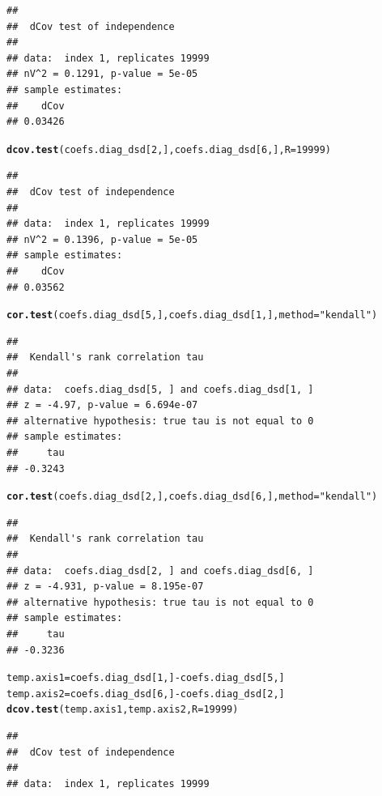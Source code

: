 \documentclass{article}\usepackage[]{graphicx}\usepackage[]{color}
\makeatletter
\newcommand{\hlnum}[1]{\textcolor[rgb]{0.686,0.059,0.569}{#1}}%
\newcommand{\hlstr}[1]{\textcolor[rgb]{0.192,0.494,0.8}{#1}}%
\newcommand{\hlopt}[1]{\textcolor[rgb]{0,0,0}{#1}}%
\newcommand{\hlstd}[1]{\textcolor[rgb]{0.345,0.345,0.345}{#1}}%
\newcommand{\hlkwb}[1]{\textcolor[rgb]{0.69,0.353,0.396}{#1}}%
\newcommand{\hlkwc}[1]{\textcolor[rgb]{0.333,0.667,0.333}{#1}}%
\newcommand{\hlkwd}[1]{\textcolor[rgb]{0.737,0.353,0.396}{\textbf{#1}}}%
\newenvironment{kframe}{%
 \def\at@end@of@kframe{}%
 \ifinner\ifhmode%
  \def\at@end@of@kframe{\end{minipage}}%
  \begin{minipage}{\columnwidth}%
 \fi\fi%
 \def\FrameCommand##1{\hskip\@totalleftmargin \hskip-\fboxsep
 \colorbox{shadecolor}{##1}\hskip-\fboxsep
     \hskip-\linewidth \hskip-\@totalleftmargin \hskip\columnwidth}%
 \MakeFramed {\advance\hsize-\width
   \@totalleftmargin\z@ \linewidth\hsize
   \@setminipage}}%
 {\par\unskip\endMakeFramed%
 \at@end@of@kframe}
\newenvironment{knitrout}{}{} %
\makeatother
\begin{document}
\begin{knitrout}
\begin{kframe}
\begin{alltt}
\end{alltt}
\begin{verbatim}
## 
## 	dCov test of independence
## 
## data:  index 1, replicates 19999
## nV^2 = 0.1291, p-value = 5e-05
## sample estimates:
##    dCov 
## 0.03426
\end{verbatim}
\begin{alltt}
\hlkwd{dcov.test}\hlstd{(coefs.diag_dsd[}\hlnum{2}\hlstd{,], coefs.diag_dsd[}\hlnum{6}\hlstd{,],} \hlkwc{R} \hlstd{=} \hlnum{19999}\hlstd{)}
\end{alltt}
\begin{verbatim}
## 
## 	dCov test of independence
## 
## data:  index 1, replicates 19999
## nV^2 = 0.1396, p-value = 5e-05
## sample estimates:
##    dCov 
## 0.03562
\end{verbatim}
\begin{alltt}
\hlkwd{cor.test}\hlstd{(coefs.diag_dsd[}\hlnum{5}\hlstd{,], coefs.diag_dsd[}\hlnum{1}\hlstd{,],} \hlkwc{method} \hlstd{=} \hlstr{"kendall"}\hlstd{)}
\end{alltt}
\begin{verbatim}
## 
## 	Kendall's rank correlation tau
## 
## data:  coefs.diag_dsd[5, ] and coefs.diag_dsd[1, ]
## z = -4.97, p-value = 6.694e-07
## alternative hypothesis: true tau is not equal to 0
## sample estimates:
##     tau 
## -0.3243
\end{verbatim}
\begin{alltt}
\hlkwd{cor.test}\hlstd{(coefs.diag_dsd[}\hlnum{2}\hlstd{,], coefs.diag_dsd[}\hlnum{6}\hlstd{,],} \hlkwc{method} \hlstd{=} \hlstr{"kendall"}\hlstd{)}
\end{alltt}
\begin{verbatim}
## 
## 	Kendall's rank correlation tau
## 
## data:  coefs.diag_dsd[2, ] and coefs.diag_dsd[6, ]
## z = -4.931, p-value = 8.195e-07
## alternative hypothesis: true tau is not equal to 0
## sample estimates:
##     tau 
## -0.3236
\end{verbatim}
\begin{alltt}
\hlstd{temp.axis1} \hlkwb{=} \hlstd{coefs.diag_dsd[}\hlnum{1}\hlstd{,]} \hlopt{-} \hlstd{coefs.diag_dsd[}\hlnum{5}\hlstd{,]}
\hlstd{temp.axis2} \hlkwb{=} \hlstd{coefs.diag_dsd[}\hlnum{6}\hlstd{,]} \hlopt{-} \hlstd{coefs.diag_dsd[}\hlnum{2}\hlstd{,]}
\hlkwd{dcov.test}\hlstd{(temp.axis1, temp.axis2,} \hlkwc{R} \hlstd{=} \hlnum{19999}\hlstd{)}
\end{alltt}
\begin{verbatim}
## 
## 	dCov test of independence
## 
## data:  index 1, replicates 19999

\end{verbatim}
\end{kframe}
\end{knitrout}
\end{document}
